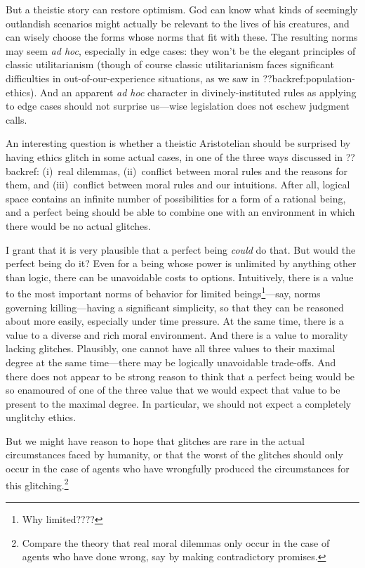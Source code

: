 But a theistic story can restore optimism. God can know what kinds of seemingly outlandish scenarios might
actually be relevant to the lives of his creatures, and can wisely choose the forms whose norms that fit with these. The resulting norms may 
seem \textit{ad hoc}, especially in edge cases: they won't be the elegant principles of classic utilitarianism (though of course classic utilitarianism
faces significant difficulties in out-of-our-experience situations, as we saw in ??backref:population-ethics). And an apparent
\textit{ad hoc} character in divinely-instituted rules as applying to edge cases should not surprise us---wise legislation does not eschew 
judgment calls.

An interesting question is whether a theistic Aristotelian should be surprised by having ethics glitch in some actual cases, in one of 
the three ways discussed in ??backref: (i)~real dilemmas, (ii)~conflict between moral rules and the reasons for them, and (iii)~conflict between
moral rules and our intuitions. After all, logical space contains an infinite number of possibilities for a form of a rational 
being, and a perfect being should be able to combine one with an environment in which there would be no actual glitches. 

I grant that it is very plausible that a perfect being \textit{could} do that. But would the perfect being do it? Even for a being
whose power is unlimited by anything other than logic, there can be unavoidable costs to options. Intuitively, there is a value to
the most important norms of behavior for limited beings\footnote{Why limited????}---say, norms governing killing---having a significant simplicity, so that
they can be reasoned about more easily, especially under time pressure.  At the same
time, there is a value to a diverse and rich moral environment. And there is a value to morality lacking glitches. Plausibly,
one cannot have all three values to their maximal degree at the same time---there may be logically unavoidable trade-offs. 
And there does not appear to be strong reason to think that a perfect being would be so enamoured of one of the three value that
we would expect that value to be present to the maximal degree. In particular, we should not expect a completely unglitchy ethics.

But we might have reason to hope that glitches are rare in the actual circumstances faced by humanity, or that the worst of the
glitches should only occur in the case of agents who have wrongfully produced the circumstances for this glitching.\footnote{Compare the theory that real moral
dilemmas only occur in the case of agents who have done wrong, say by making contradictory promises.}

